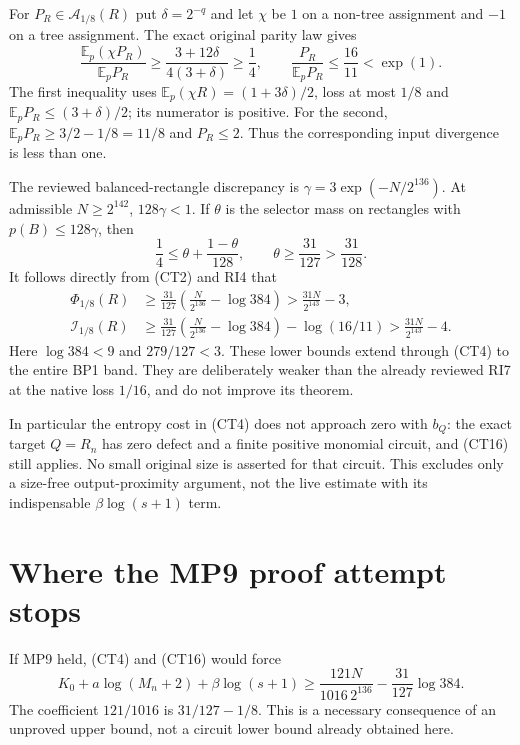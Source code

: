 \documentclass[11pt]{article}
\newcommand{\E}{\mathbb E}
\begin{document}
For $P_R\in\mathcal A_{1/8}(R)$ put $\delta=2^{-q}$ and let
$\chi$ be $1$ on a non-tree assignment and $-1$ on a tree assignment.
The exact original parity law gives
\[
 \frac{\E_p(\chi P_R)}{\E_pP_R}
 \ge\frac{3+12\delta}{4(3+\delta)}\ge\frac14,\qquad
 \frac{P_R}{\E_pP_R}\le\frac{16}{11}<\exp(1).         \tag{CT14}
\]
The first inequality uses
$\E_p(\chi R)=(1+3\delta)/2$, loss at most $1/8$ and
$\E_pP_R\le(3+\delta)/2$; its numerator is positive.
For the second, $\E_pP_R\ge3/2-1/8=11/8$ and $P_R\le2$.
Thus the corresponding input divergence is less than one.

The reviewed balanced-rectangle discrepancy is
$\gamma=3\exp(-N/2^{136})$. At admissible $N\ge2^{142}$,
$128\gamma<1$. If $\theta$ is the selector mass on rectangles
with $p(B)\le128\gamma$, then
\[
 \frac14\le\theta+\frac{1-\theta}{128},
 \qquad \theta\ge\frac{31}{127}>\frac{31}{128}.
                                                        \tag{CT15}
\]
It follows directly from (CT2) and RI4 that
\[
 \begin{split}
 \Phi_{1/8}(R)&\ge
 \frac{31}{127}\left(\frac{N}{2^{136}}-\log384\right)
 >\frac{31N}{2^{143}}-3,\\
 \mathcal I_{1/8}(R)&\ge
 \frac{31}{127}\left(\frac{N}{2^{136}}-\log384\right)
       -\log(16/11)
 >\frac{31N}{2^{143}}-4.                              \tag{CT16}
 \end{split}
\]
Here $\log384<9$ and $279/127<3$. These lower bounds extend
through (CT4) to the entire BP1 band.
They are deliberately weaker than the already reviewed RI7 at
the native loss $1/16$, and do not improve its theorem.

In particular the entropy cost in (CT4) does not approach zero
with $b_Q$: the exact target $Q=R_n$ has zero defect and a finite
positive monomial circuit, and (CT16) still applies.
No small original size is asserted for that circuit.
This excludes only a size-free output-proximity argument, not
the live estimate with its indispensable $\beta\log(s+1)$ term.

\section{Where the MP9 proof attempt stops}
If MP9 held, (CT4) and (CT16) would force
\[
 K_0+a\log(M_n+2)+\beta\log(s+1)
 \ge\frac{121N}{1016\,2^{136}}-\frac{31}{127}\log384.
                                                        \tag{CT17}
\]
The coefficient $121/1016$ is $31/127-1/8$.
This is a necessary consequence of an unproved upper bound,
not a circuit lower bound already obtained here.
\end{document}
